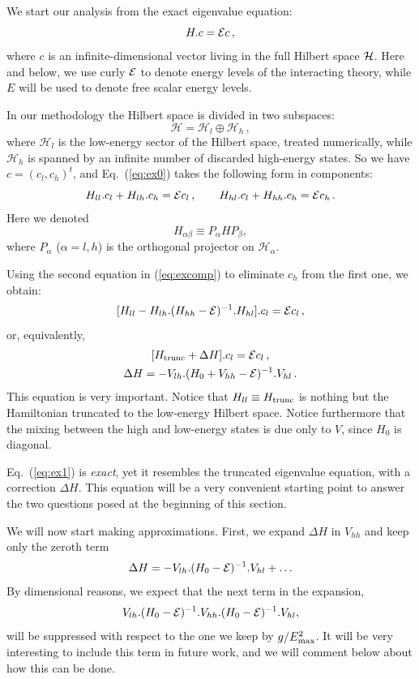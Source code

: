 \documentclass[11pt]{article}
\newcommand{\reef}[1]{(\ref{#1})}
\newcommand{\beq}{\begin{equation}}
\newcommand{\eeq}{\end{equation}}
\def\calH {{\cal H}}
\def\calE {{\cal E}}
\def\le{\leqslant}
\def \Emax{E_{\rm max}}
\numberwithin{equation}{section}
\begin{document}
We start our analysis from the exact eigenvalue equation:
\beq
H.c=\calE c\,,
\label{eq:ex0}
\eeq
where $c$ is an infinite-dimensional vector living in the full Hilbert space $\calH$. Here and below, we use curly $\calE$ to denote energy levels of the interacting theory, while $E$ will be used to denote free scalar energy levels.

In our methodology the Hilbert space is divided in two subspaces: 
\begin{equation}
\mathcal{H} = \mathcal{H}_l \oplus \mathcal{H}_h\,,
\end{equation}
%
where $ \mathcal{H}_l$ is the low-energy sector of the Hilbert space, treated numerically, while $ \mathcal{H}_h$ is spanned by an infinite number of discarded high-energy states.
So we have $c=(c_l,c_h)^t$, and Eq.~\reef{eq:ex0} takes the following form in components:
\beq
H_{ll}.c_l+H_{lh}.c_h=\calE c_l\,,\qquad H_{hl}.c_l+H_{hh}.c_h=\calE c_h\,.
\label{eq:excomp}
\eeq
Here we denoted
\beq
H_{\alpha\beta}\equiv P_\alpha H P_\beta, 
\eeq
where $P_\alpha$ ($\alpha=l,h$) is the orthogonal projector on $\mathcal{H}_\alpha$.

Using the second equation in \reef{eq:excomp} to eliminate $c_h$ from the first one, we obtain:
\beq
\label{eq:ex}
[H_{ll}- H_{lh}.(H_{hh}-\calE)^{-1}.H_{hl}].c_l = \calE c_l\,,
\eeq 
or, equivalently,
\begin{gather}
\label{eq:ex1}
[H_{\rm trunc}+\Delta H].c_l = \calE c_l\,,\\
 \Delta H = - V_{lh}.(H_0+V_{hh}-\calE)^{-1}.V_{hl}\,.
\end{gather} 
This equation is very important. Notice that $H_{ll}\equiv H_{\rm trunc} $ is nothing but the Hamiltonian truncated to the low-energy Hilbert space. Notice furthermore that the mixing between the high and low-energy states is due only to $V$, since $H_0$ is diagonal. 

Eq.~\reef{eq:ex1} is \emph{exact}, yet it resembles the truncated eigenvalue equation, with a correction $\Delta H$. This equation will be a very convenient starting point to answer the two questions posed at the beginning of this section.
 
We will now start making approximations. First, we expand $\Delta H$ in $V_{hh}$ and keep only the zeroth term
\beq
 \label{eq:dhappr}
 \Delta H = - V_{lh}.(H_0-\calE)^{-1}.V_{hl}+\ldots
 \eeq
By dimensional reasons, we expect that the next term in the expansion, 
\beq
 \label{eq:nlo}
V_{lh}.(H_0-\calE)^{-1}.V_{hh}.(H_0-\calE)^{-1}.V_{hl},
\eeq 
will be suppressed with respect to the one we keep by $g/{\Emax^2}$. It will be very interesting to include this term in future work, and we will comment below about how this can be done. 
  
\end{document}
